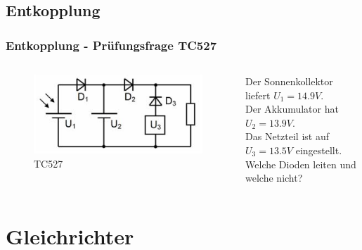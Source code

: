 \subsection*{Entkopplung}
\begin{frame}
  \frametitle{Entkopplung - Prüfungsfrage TC527}
  \begin{columns}[c]
    \begin{center}
      \begin{figure}
        \includegraphics[width=1\textwidth,height=.75\textheight,keepaspectratio]{a05/TC527.png}
        \caption{TC527}
      \end{figure}
    \end{center}
    Der Sonnenkollektor liefert $U_1 = 14.9V$. \\[0.2em]
    Der Akkumulator hat $U_2 = 13.9V$. \\[0.2em]
    Das Netzteil ist auf $U_3 = 13.5V$ eingestellt. \\[1.2em]
    Welche Dioden leiten und welche nicht?
  \end{columns}
\end{frame}

\section*{Gleichrichter}

